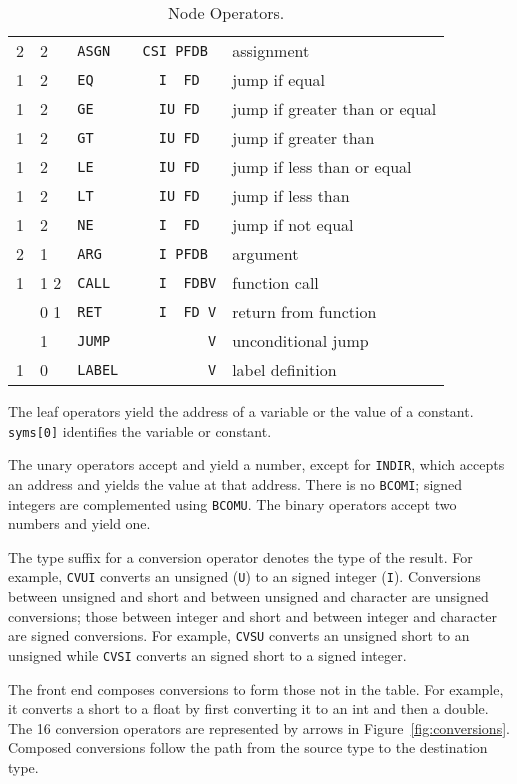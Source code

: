 \begin{table}
\begin{center}
\begin{tabular}{lllll}
 2	& 2	& \tt ASGN	& \verb|CSI PFDB |	& assignment \\
 1	& 2	& \tt EQ	& \verb|  I  FD  |	& jump if equal \\
 1	& 2	& \tt GE	& \verb|  IU FD  |	& jump if greater than or equal \\
 1	& 2	& \tt GT	& \verb|  IU FD  |	& jump if greater than \\
 1	& 2	& \tt LE	& \verb|  IU FD  |	& jump if less than or equal \\
 1	& 2	& \tt LT	& \verb|  IU FD  |	& jump if less than \\
 1	& 2	& \tt NE	& \verb|  I  FD  |	& jump if not equal \\[1.5ex]

 2	& 1	& \tt ARG	& \verb|  I PFDB |	& argument \\
 1	& 1 2	& \tt CALL	& \verb|  I  FDBV|	& function call \\
	& 0 1	& \tt RET	& \verb|  I  FD V|	& return from function \\[1.5ex]

  	& 1	& \tt JUMP	& \verb|        V|	& unconditional jump \\
 1	& 0	& \tt LABEL	& \verb|        V|	& label definition \\
\end{tabular}
\end{center}
\caption{Node Operators.\label{dags:op-table}}
\end{table}

The leaf operators yield the address of a variable or the value of a
constant. \verb|syms[0]| identifies the variable or constant.

The unary operators accept and yield a number, except for \verb|INDIR|,
which accepts an address and yields the value at that address.
There is no \verb|BCOMI|; signed integers are complemented using
\verb|BCOMU|. The binary operators accept two numbers and yield one.

The type suffix for a conversion operator denotes the type of the
result.  For example, \verb|CVUI| converts an unsigned (\verb|U|) to an
signed integer (\verb|I|).  Conversions between unsigned and short and
between unsigned and character are unsigned conversions; those between
integer and short and between integer and character are signed
conversions.  For example, \verb|CVSU| converts an unsigned short to an
unsigned while \verb|CVSI| converts an signed short to a signed
integer.

The front end composes conversions to form those not in the table.
For example, it converts a short to a float by first
converting it to an int and then a double.  The 16
conversion operators are represented by arrows in Figure~\ref{fig:conversions}.
Composed conversions follow the path from the source
type to the destination type.

